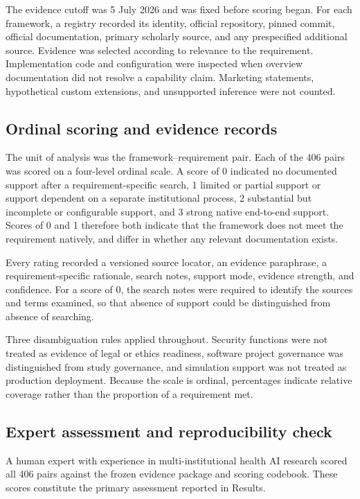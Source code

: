 \documentclass[preprint,5p, 10pt, times]{elsarticle}
\begin{document}
The evidence cutoff was 5 July 2026 and was fixed before
scoring began. For each framework, a registry recorded its identity,
official repository, pinned commit, official documentation, primary
scholarly source, and any prespecified additional source. Evidence was
selected according to relevance to the requirement. Implementation code and
configuration were inspected when overview documentation did not resolve a
capability claim. Marketing statements, hypothetical custom extensions, and
unsupported inference were not counted.

\subsection*{Ordinal scoring and evidence records}
The unit of analysis was the framework--requirement pair. Each of the 406
pairs was scored on a four-level ordinal scale. A score of 0 indicated no
documented support after a requirement-specific search, 1 limited or partial
support or support dependent on a separate institutional process, 2
substantial but incomplete or configurable support, and 3 strong native
end-to-end support. Scores of 0 and 1 therefore both indicate that the
framework does not meet the requirement natively, and differ in whether any
relevant documentation exists.

Every rating recorded a versioned source locator, an evidence paraphrase, a
requirement-specific rationale, search notes, support mode, evidence
strength, and confidence. For a score of 0, the search notes were required
to identify the sources and terms examined, so that absence of support could
be distinguished from absence of searching.

Three disambiguation rules applied throughout. Security functions were not
treated as evidence of legal or ethics readiness, software project
governance was distinguished from study governance, and simulation support
was not treated as production deployment. Because the scale is ordinal,
percentages indicate relative coverage rather than the proportion of a
requirement met.

\subsection*{Expert assessment and reproducibility check}
A human expert with experience in multi-institutional health AI research
scored all 406 pairs against the frozen evidence package and scoring
codebook. These scores constitute the primary assessment reported in
Results.
\end{document}
